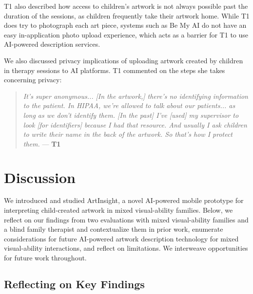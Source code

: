 \documentclass[sigconf]{acmart}
\begin{document}
T1 also described how access to children's artwork is not always possible past the duration of the sessions, as children frequently take their artwork home. While T1 does try to photograph each art piece, systems such as Be My AI do not have an easy in-application photo upload experience, which acts as a barrier for T1 to use AI-powered description services.

We also discussed privacy implications of uploading artwork created by children in therapy sessions to AI platforms. T1 commented on the steps she takes concerning privacy: 

\begin{quote}
    \textit{It's super anonymous... [In the artwork,] there's no identifying information to the patient. In HIPAA, we're allowed to talk about our patients... as long as we don't identify them. [In the past] I've [used] my supervisor to look [for identifiers] because I had that resource. And usually I ask children to write their name in the back of the artwork. So that's how I protect them.} --- \textbf{T1}
\end{quote}

\section{Discussion}
We introduced and studied ArtInsight, a novel AI-powered mobile prototype for interpreting child-created artwork in mixed visual-ability families. Below, we reflect on our findings from two evaluations with mixed visual-ability families and a blind family therapist and contextualize them in prior work, enumerate considerations for future AI-powered artwork description technology for mixed visual-ability interactions, and reflect on limitations. We interweave opportunities for future work throughout.

\subsection{Reflecting on Key Findings}
\end{document}
